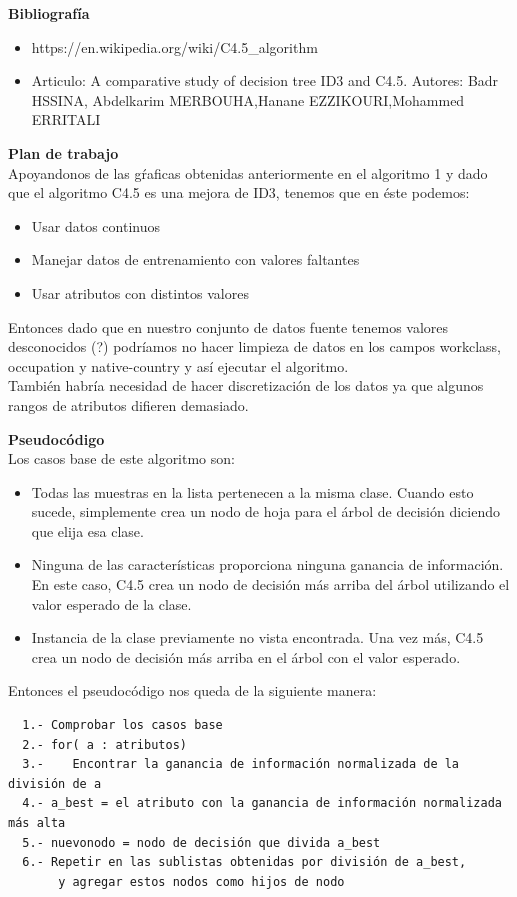 \documentclass{article}
\begin{document}
{\bf Bibliografía}
\begin{itemize}
 \item https://en.wikipedia.org/wiki/C4.5\_algorithm
 \item Articulo: A comparative study of decision tree ID3 and C4.5. Autores: Badr HSSINA, Abdelkarim MERBOUHA,Hanane EZZIKOURI,Mohammed ERRITALI
\end{itemize}


{\bf Plan de trabajo}\\

Apoyandonos de las gŕaficas obtenidas anteriormente en el algoritmo 1 y dado que el algoritmo C4.5 es una mejora de ID3, tenemos que en éste podemos:
\begin{itemize}
\item Usar datos continuos
\item Manejar datos de entrenamiento con valores faltantes
\item Usar atributos con distintos valores
\end{itemize}

Entonces dado que en nuestro conjunto de datos fuente tenemos valores desconocidos (?) podríamos no hacer limpieza de datos en los campos workclass, occupation y native-country y así ejecutar el algoritmo.\\

También habría necesidad de hacer discretización de los datos ya que algunos rangos de atributos difieren demasiado.

{\bf Pseudocódigo}\\
Los casos base de este algoritmo son:
\begin{itemize}
  \item Todas las muestras en la lista pertenecen a la misma clase. Cuando esto sucede, simplemente crea un nodo de hoja para el árbol de decisión diciendo que elija esa clase.
  \item Ninguna de las características proporciona ninguna ganancia de información. En este caso, C4.5 crea un nodo de decisión más arriba del árbol utilizando el valor esperado de la clase.
  \item Instancia de la clase previamente no vista encontrada. Una vez más, C4.5 crea un nodo de decisión más arriba en el árbol con el valor esperado.
\end{itemize}
Entonces el pseudocódigo nos queda de la siguiente manera:
\begin{verbatim}
  1.- Comprobar los casos base
  2.- for( a : atributos)
  3.-    Encontrar la ganancia de información normalizada de la división de a
  4.- a_best = el atributo con la ganancia de información normalizada más alta
  5.- nuevonodo = nodo de decisión que divida a_best
  6.- Repetir en las sublistas obtenidas por división de a_best,
       y agregar estos nodos como hijos de nodo
\end{verbatim}
\end{document}
